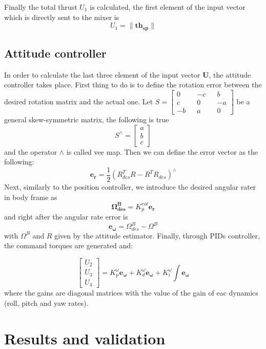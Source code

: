 \noindent
Finally the total thrust $U_1$ is calculated, the first element of the input vector which is directly sent to the mixer is
\begin{equation}
	U_1 =  {\lVert\boldsymbol{th_{sp}}\rVert}
\end{equation}



\subsection{Attitude controller}

In order to calculate the last three element of the input vector $\boldsymbol{U}$, the attitude controller takes place. First thing to do is to define the rotation error between the desired rotation matrix and the actual one. Let $S = \begin{bmatrix}
0  && -c && b  \\
c  && 0  && -a \\
-b && a  && 0 
\end{bmatrix}$ be a general skew-symmetric matrix, the following is true
\begin{equation}
	S^{\wedge} = \begin{bmatrix}a\\b\\c\end{bmatrix}
\end{equation}
and the operator $\wedge$ is called vee map. Then we can define the error vector as the following:
\begin{equation}
	\boldsymbol{e_r} = \frac{1}{2} (R^T_{des} R - R^TR_{des} )^\wedge
\end{equation}
Next, similarly to the position controller, we introduce the desired angular rater in body frame as
\begin{equation}
	\boldsymbol{\Omega^B_{des}} = K_p^{rot} \boldsymbol{e_r} 
\end{equation}
and right after the angular rate error is 
\begin{equation}
	\boldsymbol{e_\omega} = \Omega^B_{des} - \Omega^B
\end{equation}
with $\Omega^B$ and $R$ given by the attitude estimator.
Finally, through PIDs controller, the command torques are generated and:

\begin{equation}
	\begin{bmatrix}
	U_2\\U_3\\U_4
	\end{bmatrix} =  K_p^{\omega}  \boldsymbol{e_\omega} + K_d^{\omega} { \boldsymbol{\dot{e}_\omega}} + K_i^{\omega} \int \boldsymbol{e_\omega}
\end{equation}
where the gains are diagonal matrices with the value of the gain of eac dynamics (roll, pitch and yaw rates).


\section{Results and validation}









